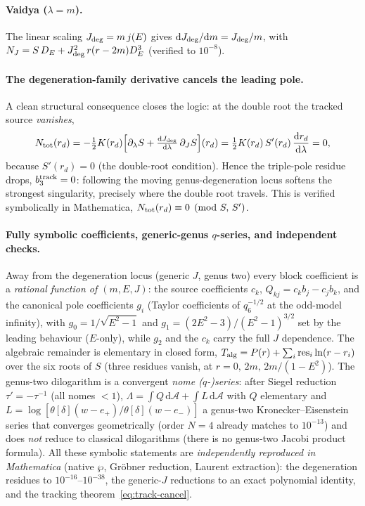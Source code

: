 \documentclass[12pt]{iopart}
\newcommand{\Jc}{J_{\rm deg}}
\newcommand{\dd}{\mathrm{d}}
\begin{document}
\paragraph{Vaidya ($\lambda=m$).}
The linear scaling $\Jc=m\,j(E)$ gives $\dd\Jc/\dd m=\Jc/m$, with
$N_J=S\,D_E+\Jc^2\,r(r-2m)D_E^3$ (verified to $10^{-8}$).

\paragraph{The degeneration-family derivative cancels the leading pole.}
A clean structural consequence closes the logic: at the double root the tracked
source \emph{vanishes},
\begin{equation}
N_{\rm tot}(r_d)=-\tfrac12K(r_d)\Big[\partial_\lambda S
+\tfrac{\dd\Jc}{\dd\lambda}\,\partial_JS\Big](r_d)
=\tfrac12K(r_d)\,S'(r_d)\,\frac{\dd r_d}{\dd\lambda}=0,
\label{eq:track-cancel}
\end{equation}
because $S'(r_d)=0$ (the double-root condition). Hence the triple-pole
residue drops, $b_3^{\rm track}=0$: following the moving genus-degeneration locus softens the
strongest singularity, precisely where the double root travels. This is verified
symbolically in Mathematica, $N_{\rm tot}(r_d)\equiv0\pmod{S,\,S'}$.

\paragraph{Fully symbolic coefficients, generic-genus $q$-series, and independent checks.}
Away from the degeneration locus (generic $J$, genus two) every block coefficient is a
\emph{rational function of $(m,E,J)$}: the source coefficients $c_k$,
$Q_{kj}=c_kb_j-c_jb_k$, and the canonical pole coefficients $g_i$ (Taylor
coefficients of $q_6^{-1/2}$ at the odd-model infinity), with
$g_0=1/\sqrt{E^2-1}$ and $g_1=(2E^2-3)/(E^2-1)^{3/2}$ set by the leading behaviour
($E$-only), while $g_2$ and the $c_k$ carry the full $J$ dependence. The
algebraic remainder is elementary in closed form,
$T_{\rm alg}=P(r)+\sum_i\mathrm{res}_i\ln(r-r_i)$ over the six roots of $S$
(three residues vanish, at $r=0,\,2m,\,2m/(1-E^2)$). The genus-two dilogarithm is a
convergent \emph{nome ($q$-)series}: after Siegel reduction $\tau'=-\tau^{-1}$ (all
nomes ${<}1$), $\Lambda=\int Q\,\dd\mathcal A+\int L\,\dd\mathcal A$ with $Q$
elementary and $L=\log[\theta[\delta](w-e_+)/\theta[\delta](w-e_-)]$ a genus-two
Kronecker--Eisenstein series that converges geometrically (order $N{=}4$ already
matches to $10^{-13}$) and does \emph{not} reduce to classical dilogarithms (there is
no genus-two Jacobi product formula). All these symbolic statements are
\emph{independently reproduced in Mathematica} (native $\wp$, Gröbner reduction,
Laurent extraction): the degeneration residues to $10^{-16}$--$10^{-38}$, the generic-$J$
reductions to an exact polynomial identity, and the tracking
theorem~\eqref{eq:track-cancel}.
\end{document}
